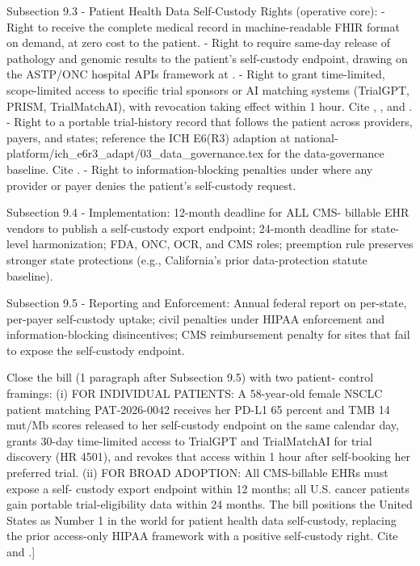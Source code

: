 Subsection 9.3 - Patient Health Data Self-Custody Rights (operative
core):
- Right to receive the complete medical record in machine-readable
  FHIR format on demand, at zero cost to the patient.
- Right to require same-day release of pathology and genomic
  results to the patient's self-custody endpoint, drawing on the
  ASTP/ONC hospital APIs framework at
  \cite{astp_onc_hospital_apis_2024}.
- Right to grant time-limited, scope-limited access to specific
  trial sponsors or AI matching systems (TrialGPT, PRISM,
  TrialMatchAI), with revocation taking effect within 1 hour. Cite
  \cite{jin2024trialgpt}, \cite{gupta2024prism}, and
  \cite{abdallah2026trialmatchai}.
- Right to a portable trial-history record that follows the patient
  across providers, payers, and states; reference the ICH E6(R3)
  adaption at national-platform/ich\_e6r3\_adapt/03\_data\_governance.tex
  for the data-governance baseline. Cite \cite{kawchak_2026_18973368}.
- Right to information-blocking penalties under
  \cite{federal_register_info_blocking_disincentives_2024} where any
  provider or payer denies the patient's self-custody request.

Subsection 9.4 - Implementation: 12-month deadline for ALL CMS-
billable EHR vendors to publish a self-custody export endpoint;
24-month deadline for state-level harmonization; FDA, ONC, OCR, and
CMS roles; preemption rule preserves stronger state protections
(e.g., California's prior data-protection statute baseline).

Subsection 9.5 - Reporting and Enforcement: Annual federal report
on per-state, per-payer self-custody uptake; civil penalties under
HIPAA enforcement and information-blocking disincentives; CMS
reimbursement penalty for sites that fail to expose the self-custody
endpoint.

Close the bill (1 paragraph after Subsection 9.5) with two patient-
control framings:
(i) FOR INDIVIDUAL PATIENTS: A 58-year-old female NSCLC patient
    matching PAT-2026-0042 receives her PD-L1 65 percent and TMB 14
    mut/Mb scores released to her self-custody endpoint on the same
    calendar day, grants 30-day time-limited access to TrialGPT and
    TrialMatchAI for trial discovery (HR 4501), and revokes that
    access within 1 hour after self-booking her preferred trial.
(ii) FOR BROAD ADOPTION: All CMS-billable EHRs must expose a self-
     custody export endpoint within 12 months; all U.S. cancer
     patients gain portable trial-eligibility data within 24 months.
     The bill positions the United States as Number 1 in the world
     for patient health data self-custody, replacing the prior
     access-only HIPAA framework with a positive self-custody right.
     Cite \cite{kawchak_2026_19119939} and
     \cite{kawchak_2026_19994945}.]
